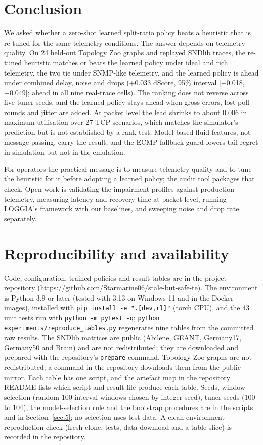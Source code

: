 \documentclass[journal]{IEEEtran}
\begin{document}
\section{Conclusion}
\label{sec:9}
We asked whether a zero-shot learned split-ratio policy beats a heuristic that is re-tuned for the same telemetry conditions. The answer depends on telemetry quality. On 24 held-out Topology Zoo graphs and replayed SNDlib traces, the re-tuned heuristic matches or beats the learned policy under ideal and rich telemetry, the two tie under SNMP-like telemetry, and the learned policy is ahead under combined delay, noise and drops (+0.033 dScore, 95\% interval [+0.018, +0.049]; ahead in all nine real-trace cells). The ranking does not reverse across five tuner seeds, and the learned policy stays ahead when gross errors, lost poll rounds and jitter are added. At packet level the lead shrinks to about 0.006 in maximum utilisation over 27 TCP scenarios, which matches the simulator's prediction but is not established by a rank test. Model-based fluid features, not message passing, carry the result, and the ECMP-fallback guard lowers tail regret in simulation but not in the emulation.

For operators the practical message is to measure telemetry quality and to tune the heuristic for it before adopting a learned policy; the audit tool packages that check. Open work is validating the impairment profiles against production telemetry, measuring latency and recovery time at packet level, running LOGGIA's framework with our baselines, and sweeping noise and drop rate separately.

\section{Reproducibility and availability}
\label{sec:10}
Code, configuration, trained policies and result tables are in the project repository (https://github.com/Starmarine06/stale-but-safe-te). The environment is Python 3.9 or later (tested with 3.13 on Windows 11 and in the Docker images), installed with \texttt{pip install -e ".[dev,rl]"} (torch CPU), and the 43 unit tests run with \texttt{python -m pytest -q}; \texttt{python experiments/reproduce\_tables.py} regenerates nine tables from the committed raw results. The SNDlib matrices are public (Abilene, GEANT, Germany17, Germany50 and Brain) and are not redistributed; they are downloaded and prepared with the repository's \texttt{prepare} command. Topology Zoo graphs are not redistributed; a command in the repository downloads them from the public mirror. Each table has one script, and the artefact map in the repository README lists which script and result file produce each table. Seeds, window selection (random 100-interval windows chosen by integer seed), tuner seeds (100 to 104), the model-selection rule and the bootstrap procedures are in the scripts and in Section~\ref{sec:5}; no selection uses test data. A clean-environment reproduction check (fresh clone, tests, data download and a table slice) is recorded in the repository.
\end{document}
